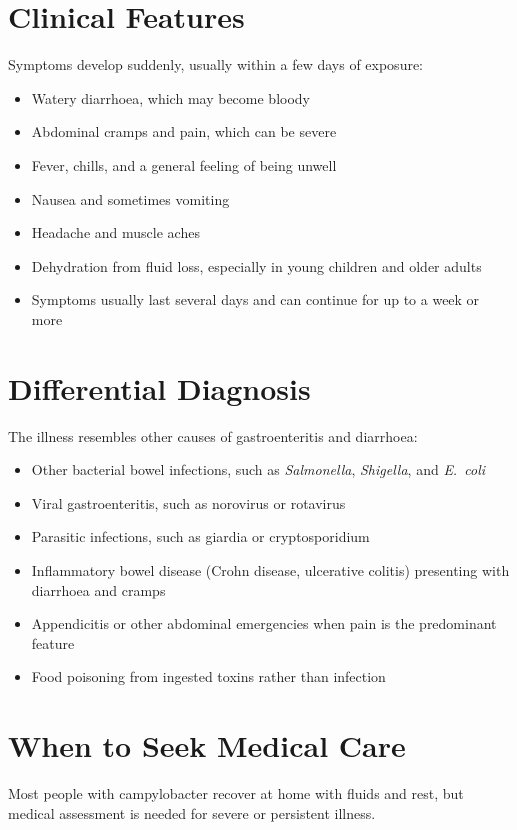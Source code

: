 \section*{Clinical Features}
Symptoms develop suddenly, usually within a few days of exposure:
\begin{itemize}
    \item Watery diarrhoea, which may become bloody
    \item Abdominal cramps and pain, which can be severe
    \item Fever, chills, and a general feeling of being unwell
    \item Nausea and sometimes vomiting
    \item Headache and muscle aches
    \item Dehydration from fluid loss, especially in young children and older adults
    \item Symptoms usually last several days and can continue for up to a week or more
\end{itemize}

\section*{Differential Diagnosis}
The illness resembles other causes of gastroenteritis and diarrhoea:
\begin{itemize}
    \item Other bacterial bowel infections, such as \textit{Salmonella}, \textit{Shigella}, and \textit{E.\ coli}
    \item Viral gastroenteritis, such as norovirus or rotavirus
    \item Parasitic infections, such as giardia or cryptosporidium
    \item Inflammatory bowel disease (Crohn disease, ulcerative colitis) presenting with diarrhoea and cramps
    \item Appendicitis or other abdominal emergencies when pain is the predominant feature
    \item Food poisoning from ingested toxins rather than infection
\end{itemize}

\section*{When to Seek Medical Care}
Most people with campylobacter recover at home with fluids and rest, but medical assessment is needed for severe or persistent illness.

